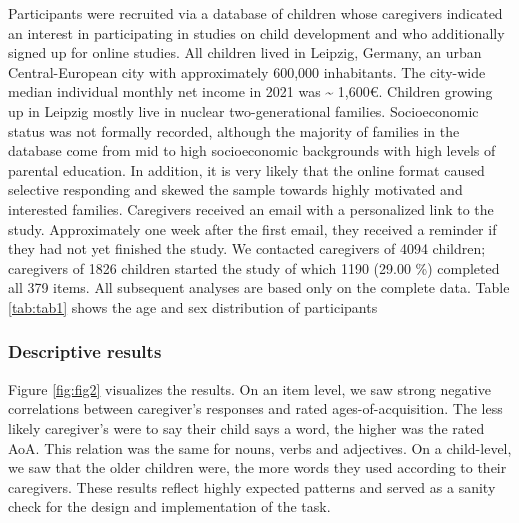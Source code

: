 \documentclass[
  man,floatsintext]{apa6}
\begin{document}
Participants were recruited via a database of children whose caregivers indicated an interest in participating in studies on child development and who additionally signed up for online studies. All children lived in Leipzig, Germany, an urban Central-European city with approximately 600,000 inhabitants. The city-wide median individual monthly net income in 2021 was \textasciitilde{} 1,600€. Children growing up in Leipzig mostly live in nuclear two-generational families. Socioeconomic status was not formally recorded, although the majority of families in the database come from mid to high socioeconomic backgrounds with high levels of parental education. In addition, it is very likely that the online format caused selective responding and skewed the sample towards highly motivated and interested families. Caregivers received an email with a personalized link to the study. Approximately one week after the first email, they received a reminder if they had not yet finished the study. We contacted caregivers of 4094 children; caregivers of 1826 children started the study of which 1190 (29.00 \%) completed all 379 items. All subsequent analyses are based only on the complete data. Table \ref{tab:tab1} shows the age and sex distribution of participants

\hypertarget{descriptive-results}{%
\subsubsection{Descriptive results}\label{descriptive-results}}

Figure \ref{fig:fig2} visualizes the results. On an item level, we saw strong negative correlations between caregiver's responses and rated ages-of-acquisition. The less likely caregiver's were to say their child says a word, the higher was the rated AoA. This relation was the same for nouns, verbs and adjectives. On a child-level, we saw that the older children were, the more words they used according to their caregivers. These results reflect highly expected patterns and served as a sanity check for the design and implementation of the task.
\end{document}
